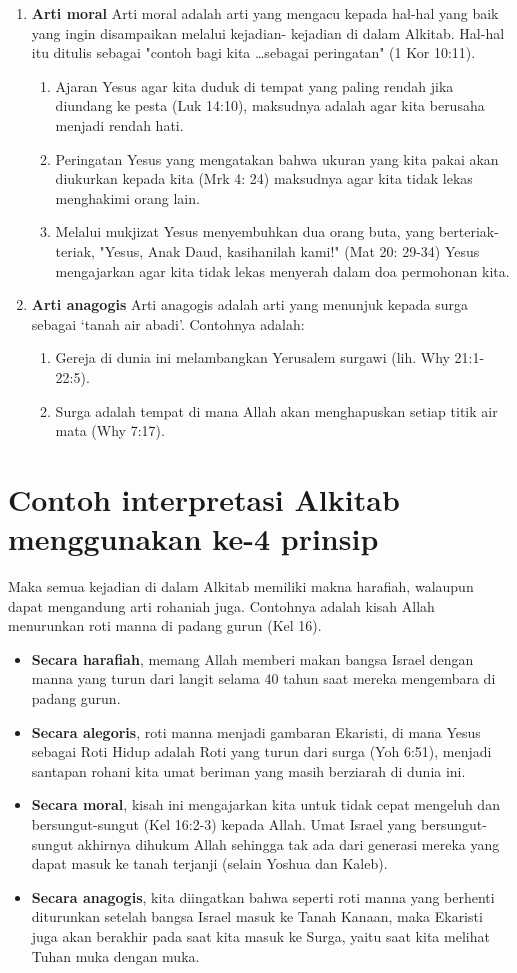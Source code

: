 \begin{enumerate}
\item \textbf{Arti moral}
Arti moral adalah arti yang mengacu kepada hal-hal yang baik yang ingin disampaikan melalui kejadian- kejadian di dalam Alkitab. Hal-hal itu ditulis sebagai "contoh bagi kita \dots sebagai peringatan" (1 Kor 10:11).
\begin{enumerate}
\item Ajaran Yesus agar kita duduk di tempat yang paling rendah jika diundang ke pesta (Luk 14:10), maksudnya adalah agar kita berusaha menjadi rendah hati.
\item Peringatan Yesus yang mengatakan bahwa ukuran yang kita pakai akan diukurkan kepada kita (Mrk 4: 24) maksudnya agar kita tidak lekas menghakimi orang lain.
\item Melalui mukjizat Yesus menyembuhkan dua orang buta, yang berteriak-teriak, "Yesus, Anak Daud, kasihanilah kami!" (Mat 20: 29-34) Yesus mengajarkan agar kita tidak lekas menyerah dalam doa permohonan kita.
\end{enumerate}

\item  \textbf{Arti anagogis}
Arti anagogis adalah arti yang menunjuk kepada surga sebagai ‘tanah air abadi’. Contohnya adalah:
\begin{enumerate}
\item Gereja di dunia ini melambangkan Yerusalem surgawi (lih. Why 21:1-22:5).
\item Surga adalah tempat di mana Allah akan menghapuskan setiap titik air mata (Why 7:17).
\end{enumerate}
\end{enumerate}

\section*{Contoh interpretasi Alkitab menggunakan ke-4 prinsip}
Maka semua kejadian di dalam Alkitab memiliki makna harafiah, walaupun dapat mengandung arti rohaniah juga. Contohnya adalah kisah Allah menurunkan roti manna di padang gurun (Kel 16).
\begin{itemize}
\item \textbf{Secara harafiah}, memang Allah memberi makan bangsa Israel dengan manna yang turun dari langit selama 40 tahun saat mereka mengembara di padang gurun.
\item \textbf{Secara alegoris}, roti manna menjadi gambaran Ekaristi, di mana Yesus sebagai Roti Hidup adalah Roti yang turun dari surga (Yoh 6:51), menjadi santapan rohani kita umat beriman yang masih berziarah di dunia ini.
\item \textbf{Secara moral}, kisah ini mengajarkan kita untuk tidak cepat mengeluh dan bersungut-sungut (Kel 16:2-3) kepada Allah. Umat Israel yang bersungut-sungut akhirnya dihukum Allah sehingga tak ada dari generasi mereka yang dapat masuk ke tanah terjanji (selain Yoshua dan Kaleb).
\item \textbf{Secara anagogis}, kita diingatkan bahwa seperti roti manna yang berhenti diturunkan setelah bangsa Israel masuk ke Tanah Kanaan, maka Ekaristi juga akan berakhir pada saat kita masuk ke Surga, yaitu saat kita melihat Tuhan muka dengan muka.
\end{itemize}

